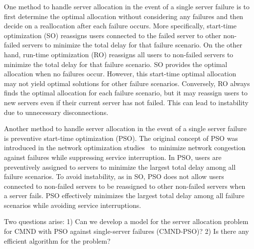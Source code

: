 \documentclass[10pt, letterpaper]{IEEEtran}
\begin{document}
\begin{CJK}{UTF8}{ipxm}
One method to handle server allocation in the event of a single server failure is to first determine the optimal allocation without considering any failures and then decide on a reallocation after each failure occurs.
More specifically, start-time optimization (SO) reassigns users connected to the failed server to other non-failed servers to minimize the total delay for that failure scenario. On the other hand, 
run-time optimization (RO) reassigns all users to non-failed servers to minimize the total delay for that failure scenario.
SO provides the optimal allocation when no failures occur.
However, this start-time optimal allocation may not yield optimal solutions for other failure scenarios.
Conversely, RO always finds the optimal allocation for each failure scenario, but it may reassign users to new servers even if their current server has not failed.
This can lead to instability due to unnecessary disconnections.

Another method to handle server allocation in the event of a single server failure is preventive start-time optimization (PSO). The original concept of PSO was introduced in the network optimization studies~\cite{5_9_13_Kamrul2010,OkiDRCN2014} to minimize network congestion against failures while suppressing service interruption.
In PSO, users are preventively assigned to servers to minimize the largest total delay among all failure scenarios. 
To avoid instability, as in SO, PSO does not allow users connected to non-failed servers to be reassigned to other non-failed servers when a server fails.
PSO effectively minimizes the largest total delay among all failure scenarios while avoiding service interruptions.

Two questions arise: 
1) Can we develop a model for the server allocation problem for CMND with PSO against single-server failures (CMND-PSO)?
2) Is there any efficient algorithm for the problem?


\end{CJK}
\end{document}
